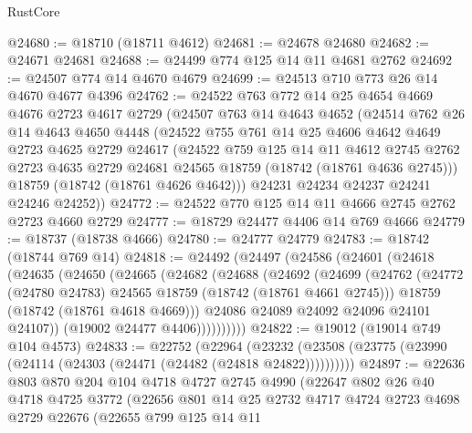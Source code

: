 \begin{lexlean}{RustCore}
\begin{coremodule}
@24680 := @18710 (@18711 @4612)
@24681 := @24678 @24680
@24682 := @24671 @24681
@24688 := @24499 @774 @125 @14 @11 @4681 @2762
@24692 := @24507 @774 @14 @4670 @4679
@24699 := @24513 @710 @773 @26 @14 @4670 @4677 @4396
@24762 := @24522
    @763
    @772
    @14
    @25
    @4654
    @4669
    @4676
    @2723
    @4617
    @2729
    (@24507
      @763
      @14
      @4643
      @4652
      (@24514
        @762
        @26
        @14
        @4643
        @4650
        @4448
        (@24522
          @755
          @761
          @14
          @25
          @4606
          @4642
          @4649
          @2723
          @4625
          @2729
          @24617
          (@24522
            @759
            @125
            @14
            @11
            @4612
            @2745
            @2762
            @2723
            @4635
            @2729
            @24681
            @24565
            @18759
            (@18742 (@18761 @4636 @2745)))
          @18759
          (@18742 (@18761 @4626 @4642)))
        @24231
        @24234
        @24237
        @24241
        @24246
        @24252))
@24772 := @24522 @770 @125 @14 @11 @4666 @2745 @2762 @2723 @4660 @2729
@24777 := @18729 @24477 @4406 @14 @769 @4666
@24779 := @18737 (@18738 @4666)
@24780 := @24777 @24779
@24783 := @18742 (@18744 @769 @14)
@24818 := @24492
    (@24497
      (@24586
        (@24601
          (@24618
            (@24635
              (@24650
                (@24665
                  (@24682
                    (@24688
                      (@24692
                        (@24699
                          (@24762
                            (@24772 (@24780 @24783) @24565 @18759 (@18742 (@18761 @4661 @2745)))
                            @18759
                            (@18742 (@18761 @4618 @4669)))
                          @24086
                          @24089
                          @24092
                          @24096
                          @24101
                          @24107))
                      (@19002 @24477 @4406))))))))))
@24822 := @19012 (@19014 @749 @104 @4573)
@24833 := @22752
    (@22964 (@23232 (@23508 (@23775 (@23990 (@24114 (@24303 (@24471 (@24482 (@24818 @24822))))))))))
@24897 := @22636
    @803
    @870
    @204
    @104
    @4718
    @4727
    @2745
    @4990
    (@22647
      @802
      @26
      @40
      @4718
      @4725
      @3772
      (@22656
        @801
        @14
        @25
        @2732
        @4717
        @4724
        @2723
        @4698
        @2729
        @22676
        (@22655
          @799
          @125
          @14
          @11

\end{coremodule}
\end{lexlean}
